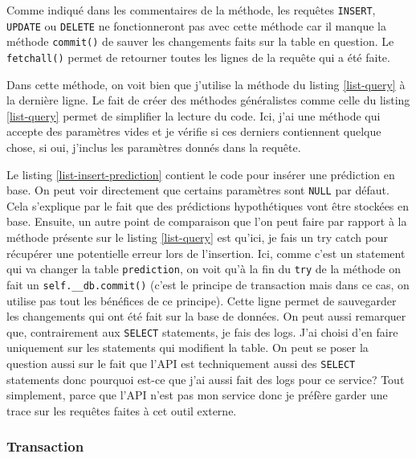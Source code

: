 \documentclass[a4paper,14pt]{extarticle}
\begin{document}
{

Comme indiqué dans les commentaires de la méthode, les requêtes \texttt{INSERT}, \texttt{UPDATE} ou \texttt{DELETE} ne fonctionneront pas avec cette méthode car il manque la méthode \texttt{commit()} de sauver les changements faits sur la table en question. Le \texttt{fetchall()} permet de retourner toutes les lignes de la requête qui a été faite.


Dans cette méthode, on voit bien que j'utilise la méthode du listing \ref{list-query} à la dernière ligne. Le fait de créer des méthodes généralistes comme celle du listing \ref{list-query} permet de simplifier la lecture du code. Ici, j'ai une méthode qui accepte des paramètres vides et je vérifie si ces derniers contiennent quelque chose, si oui, j'inclus les paramètres donnés dans la requête.


Le listing \ref{list-insert-prediction} contient le code pour insérer une prédiction en base. On peut voir directement que certains paramètres sont \texttt{NULL} par défaut. Cela s'explique par le fait que des prédictions hypothétiques vont être stockées en base. Ensuite, un autre point de comparaison que l'on peut faire par rapport à la méthode présente sur le listing \ref{list-query} est qu'ici, je fais un try catch pour récupérer une potentielle erreur lors de l'insertion. Ici, comme c'est un statement qui va changer la table \texttt{prediction}, on voit qu'à la fin du \texttt{try} de la méthode on fait un \texttt{self.\_\_db.commit()} (c'est le principe de transaction mais dans ce cas, on utilise pas tout les bénéfices de ce principe). Cette ligne permet de sauvegarder les changements qui ont été fait sur la base de données. On peut aussi remarquer que, contrairement aux \texttt{SELECT} statements, je fais des logs. J'ai choisi d'en faire uniquement sur les statements qui modifient la table.  
On peut se poser la question aussi sur le fait que l'API est techniquement aussi des \texttt{SELECT} statements donc pourquoi est-ce que j'ai aussi fait des logs pour ce service? Tout simplement, parce que l'API n'est pas mon service donc je préfère garder une trace sur les requêtes faites à cet outil externe.

\subsubsection{Transaction}

}
\end{document}
